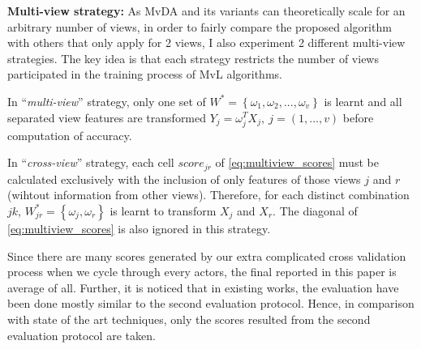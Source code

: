     \textbf{Multi-view strategy:} As MvDA and its variants can theoretically scale for an arbitrary number of views, in order to fairly compare the proposed algorithm with others that only apply for 2 views, I also experiment 2 different multi-view strategies. The key idea is that each strategy restricts the number of views participated in the training process of MvL algorithms.

    In ``\emph{multi-view}'' strategy, only one set of $W^*=\left\{{\omega}_1, {\omega}_2, ..., {\omega}_v\right\}$ is learnt and all separated view features are transformed $Y_j=\omega_j^TX_j,\ j=(1,...,v)$ before computation of accuracy.

    In ``\emph{cross-view}'' strategy, each cell ${score}_{jr}$ of \eqref{eq:multiview_scores} must be calculated exclusively with the inclusion of only features of those views $j$ and $r$ (wihtout information from other views).
    Therefore, for each distinct combination $jk$, $W_{jr}^*=\left\{{\omega}_j, {\omega}_r\right\}$ is learnt to transform $X_j$ and $X_r$. The diagonal of \eqref{eq:multiview_scores} is also ignored in this strategy.

    Since there are many scores generated by our extra complicated cross validation process when we cycle through every actors, the final reported in this paper is average of all.
    Further, it is noticed that in existing works, the evaluation have been done mostly similar to the second evaluation protocol. Hence, in comparison with state of the art techniques, only the scores resulted from the second evaluation protocol are taken.
